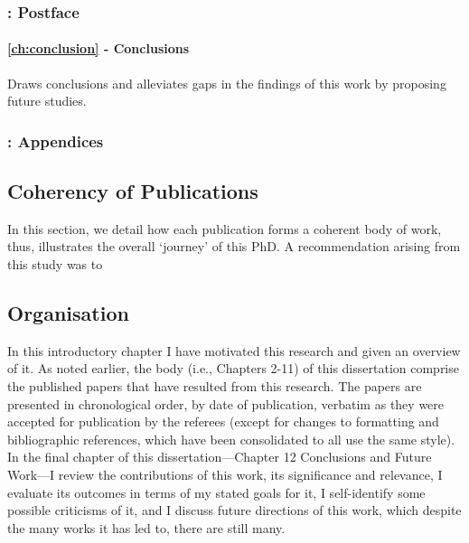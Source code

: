 \subsubsection{: Postface}

\paragraph{\cref{ch:conclusion} - Conclusions} Draws conclusions and alleviates gaps in the findings of this work by proposing future studies.

\subsubsection{: Appendices}

\subsection{Coherency of Publications}

In this section, we detail how each publication forms a coherent body of work, thus, illustrates the overall `journey' of this PhD. A recommendation arising from this study was to 

\subsection{Organisation}

In this introductory chapter I have motivated this research and given an overview of it. As noted earlier, the body (i.e., Chapters 2-11) of this dissertation comprise the published papers that have resulted from this research. The papers are presented in chronological order, by date of publication, verbatim as they were accepted for publication by the referees (except for changes to formatting and bibliographic references, which have been consolidated to all use the same style). In the final chapter of this dissertation—Chapter 12 Conclusions and Future Work—I review the contributions of this work, its significance and relevance, I evaluate its outcomes in terms of my stated goals for it, I self-identify some possible criticisms of it, and I discuss future directions of this work, which despite the many works it has led to, there are still many.


